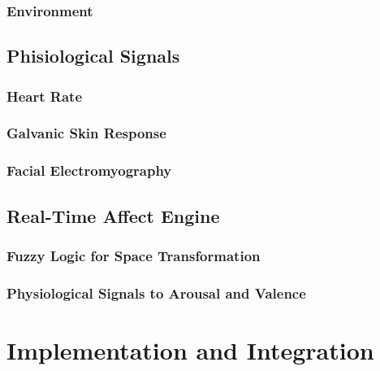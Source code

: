 \documentclass{uofsthesis-cs}
\begin{document}
\subsection{Environment}

\section{Phisiological Signals}
\subsection{Heart Rate}
\subsection{Galvanic Skin Response}
\subsection{Facial Electromyography}

\section{Real-Time Affect Engine}
\subsection{Fuzzy Logic for Space Transformation}
\subsection{Physiological Signals to Arousal and Valence}


\chapter{Implementation and Integration}
\label{chap:impl}

\end{document}
